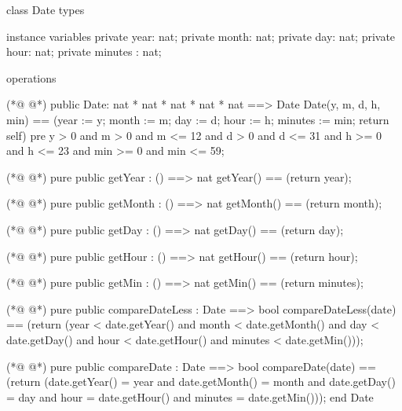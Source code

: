 \begin{vdmpp}[breaklines=true]
class Date
types

instance variables
  private year: nat;
  private month: nat;
  private day: nat;
  private hour: nat;
  private minutes : nat;
  
operations

(*@
\label{Date:13}
@*)
 public Date: nat * nat * nat * nat * nat ==> Date
 Date(y, m, d, h, min) == (year := y; month := m; day := d; hour := h; minutes := min; return self)
 pre y > 0 and m > 0 and m <= 12 and d > 0 and d <= 31 and h >= 0 and h <= 23 and min >= 0 and min <= 59;
 
(*@
\label{getYear:17}
@*)
 pure public getYear : () ==> nat
  getYear() == (return year);
  
(*@
\label{getMonth:20}
@*)
 pure public getMonth : () ==> nat
  getMonth() == (return month);
  
(*@
\label{getDay:23}
@*)
 pure public getDay : () ==> nat
  getDay() == (return day);
  
(*@
\label{getHour:26}
@*)
 pure public getHour : () ==> nat
  getHour() == (return hour);
  
(*@
\label{getMin:29}
@*)
 pure public getMin : () ==> nat
  getMin() == (return minutes);

(*@
\label{compareDateLess:32}
@*)
 pure public compareDateLess : Date ==> bool
  compareDateLess(date) == (return (year < date.getYear() and month < date.getMonth() and day < date.getDay() and hour < date.getHour() and minutes < date.getMin()));
  
(*@
\label{compareDate:35}
@*)
 pure public compareDate : Date ==> bool
  compareDate(date) == (return (date.getYear() = year and date.getMonth() = month and date.getDay() = day and hour = date.getHour() and minutes = date.getMin()));
end Date
\end{vdmpp}
